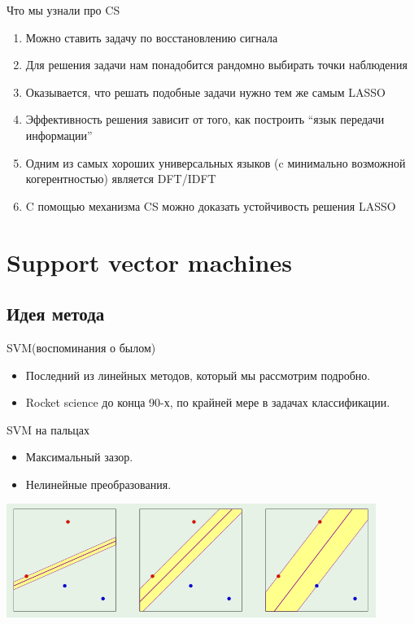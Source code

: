 \documentclass[14pt, fleqn, xcolor={dvipsnames, table}]{beamer}
\begin{document}
\begin{frame}{Что мы узнали про CS}
\small
\begin{enumerate}
  \item Можно ставить задачу по восстановлению сигнала
  \item Для решения задачи нам понадобится рандомно выбирать точки наблюдения
  \item Оказывается, что решать подобные задачи нужно тем же самым LASSO
  \item Эффективность решения зависит от того, как построить ``язык передачи информации''
  \item Одним из самых хороших универсальных языков (c минимально возможной когерентностью) является DFT/IDFT
  \item C помощью механизма CS можно доказать устойчивость решения LASSO
\end{enumerate}
\end{frame}

\section{Support vector machines}
\subsection{Идея метода}
\begin{frame}{SVM(воспоминания о былом)}
\begin{itemize}
  \item Последний из линейных методов, который мы рассмотрим подробно.
  \item Rocket science до конца 90-х, по крайней мере в задачах классификации.
\end{itemize}
\end{frame}

\begin{frame}{SVM на пальцах}
\begin{itemize}
  \item Максимальный зазор.
  \item Нелинейные преобразования.
\end{itemize}
\begin{center}
\includegraphics[width=0.9\textwidth]{SVM_1.png}
\end{center}
\end{frame}
\end{document}
